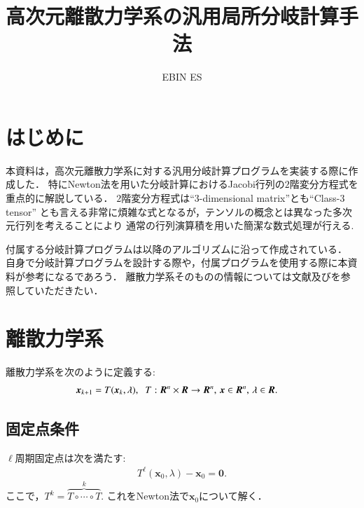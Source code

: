 \documentclass[a4paper,dvipdfmx]{jsarticle}
\begin{document}
\title{高次元離散力学系の汎用局所分岐計算手法}

\author{EBIN ES}

\maketitle


\section{はじめに}
本資料は，高次元離散力学系に対する汎用分岐計算プログラムを実装する際に作成した．
特にNewton法を用いた分岐計算におけるJacobi行列の$2$階変分方程式を重点的に解説している．
$2$階変分方程式は``$3$-dimensional matrix''とも``Class-$3$ tensor''
とも言える非常に煩雑な式となるが，テンソルの概念とは異なった多次元行列を考えることにより
通常の行列演算積を用いた簡潔な数式処理が行える.

付属する分岐計算プログラムは以降のアルゴリズムに沿って作成されている．
自身で分岐計算プログラムを設計する際や，付属プログラムを使用する際に本資料が参考になるであろう．
離散力学系そのものの情報については文献\cite{chaosCG}及び\cite{kawakami}を参照していただきたい．

\section{離散力学系}
離散力学系を次のように定義する:
\begin{align}
    \begin{split}    
    \bm{x}_{k+1} = T(\bm{x}_k, \lambda),\hspace{0.2cm}
    T:\bm{R}^n\times\bm{R}&\rightarrow\bm{R}^n,\, \bm{x}\in\bm{R}^n,\, \lambda\in\bm{R}.
    \end{split}
    \label{eq:discrete_system}
\end{align}

\subsection{固定点条件}
$\ell$周期固定点は次を満たす:
\begin{align}
    T^\ell(\bm{x}_0, \lambda) - \bm{x}_0 = \bm{0}.
\end{align}
ここで，$T^k = \overbrace{T\circ\cdots\circ T}^k$.
これをNewton法で$\bm{x}_0$について解く．
\end{document}
